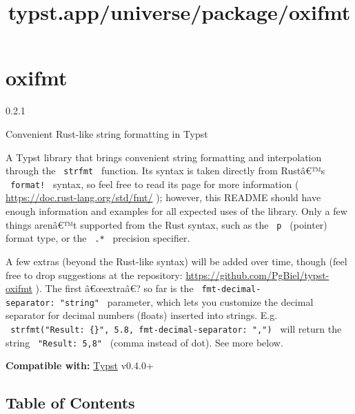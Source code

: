 \title{typst.app/universe/package/oxifmt}

\label{banner}
\section{oxifmt}\label{oxifmt}

{ 0.2.1 }

Convenient Rust-like string formatting in Typst

\label{readme}
A Typst library that brings convenient string formatting and
interpolation through the \texttt{\ strfmt\ } function. Its syntax is
taken directly from Rustâ€™s \texttt{\ format!\ } syntax, so feel free
to read its page for more information (
\url{https://doc.rust-lang.org/std/fmt/} ); however, this README should
have enough information and examples for all expected uses of the
library. Only a few things arenâ€™t supported from the Rust syntax, such
as the \texttt{\ p\ } (pointer) format type, or the \texttt{\ .*\ }
precision specifier.

A few extras (beyond the Rust-like syntax) will be added over time,
though (feel free to drop suggestions at the repository:
\url{https://github.com/PgBiel/typst-oxifmt} ). The first â€œextraâ€? so
far is the \texttt{\ fmt-decimal-separator:\ "string"\ } parameter,
which lets you customize the decimal separator for decimal numbers
(floats) inserted into strings. E.g.
\texttt{\ strfmt("Result:\ \{\}",\ 5.8,\ fmt-decimal-separator:\ ",")\ }
will return the string \texttt{\ "Result:\ 5,8"\ } (comma instead of
dot). See more below.

\textbf{Compatible with:} \href{https://github.com/typst/typst}{Typst}
v0.4.0+

\subsection{Table of Contents}\label{table-of-contents}

